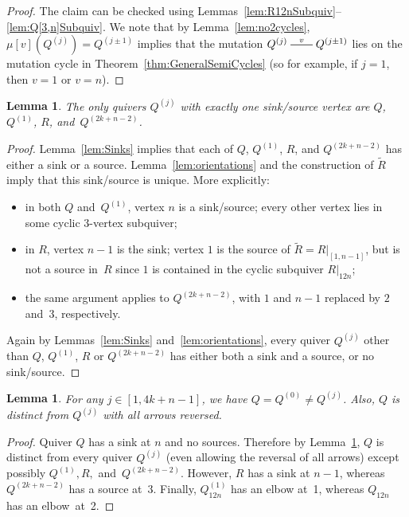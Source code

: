 \documentclass[11pt, letterpaper]{amsart}
\newcommand{\commentS}[1]{{\noindent\textsf{\color{purple}$\blacksquare$~#1~$\blacksquare$}}}
\newtheorem{lemma}[theorem]{Lemma}
\theoremstyle{definition}
\numberwithin{equation}{section}
\newcommand{\T}[2]{\mu[#1](#2)} %
\newcommand{\mutation}[1]{\stackrel{#1}{\rule[.5ex]{2em}{0.5pt}}}
\begin{document}
\begin{proof}
The claim can be checked using Lemmas~\ref{lem:R12nSubquiv}--\ref{lem:Q[3,n]Subquiv}.
We note that by Lemma~\ref{lem:no2cycles}, $\T{v}{Q^{(j)}} = Q^{(j \pm 1)}$ implies that the mutation $Q^{(j)}\mutation{v}Q^{(j \pm 1)}$
lies on the mutation cycle  in Theorem~\ref{thm:GeneralSemiCycles} 
(so for example, if $j=1$, then $v=1$ or $v=n$). 
\end{proof}

\begin{lemma}
\label{lem:oneSinkSource}
The only quivers $Q^{(j)}$ with exactly one sink/source vertex are 
$Q$, $Q^{(1)}$, $R$, and~$Q^{(2k+n-2)}$. %
\end{lemma}

\begin{proof}
Lemma~\ref{lem:Sinks} implies that each of $Q$, $Q^{(1)}$, $R$, and $Q^{(2k+n-2)}$ has either a sink or a source. 
Lemma~\ref{lem:orientations} and the construction of $\tilde R$ imply that this sink/source is unique. 
More explicitly: 
\begin{itemize}[leftmargin=.25in]
\item[(a)]
in both $Q$ and~$Q^{(1)}$, vertex $n$ is a sink/source; 
every other vertex lies in some cyclic $3$-vertex subquiver; 
\item[(b)]
in $R$, vertex $n-1$ is the sink; 
vertex $1$ is the source of $\tilde R=R|_{[1,n-1]}$, but is not a source in~$R$ since 
$1$ is contained in the cyclic subquiver $R|_{12n}$; 
\item[(c)]
the same argument applies to $Q^{(2k+n-2)}$, with $1$ and $n-1$ replaced by $2$ and~$3$, respectively. 
\end{itemize}

Again by Lemmas~\ref{lem:Sinks} and~\ref{lem:orientations}, 
every quiver $Q^{(j)}$ other than $Q$, $Q^{(1)}$, $R$ or $Q^{(2k+n-2)}$ has either
both a sink and a source, or no sink/source. 
\end{proof}

\begin{lemma}
\label{lem:Q-neq-Qj}
For any $j\in [1,4k+n-1]$, we have $Q=Q^{(0)}\neq Q^{(j)}$. 
Also, $Q$ is distinct from $Q^{(j)}$ with all arrows reversed. 
\end{lemma}

\begin{proof}
Quiver $Q$ has a sink at $n$ and no sources. 
Therefore by Lemma~\ref{lem:oneSinkSource}, 
$Q$ is distinct from every quiver $Q^{(j)}$ (even allowing the reversal of all arrows)
except possibly $Q^{(1)}, R,$ and~$Q^{(2k+n-2)}$.  
However, $R$ has a sink at $n-1$, whereas $Q^{(2k+n-2)}$ has a source at~$3$. 
Finally, $Q^{(1)}_{12n}$ has an elbow at~1, whereas $Q_{12n}$ has an elbow~at~2.   
\end{proof}
\end{document}
